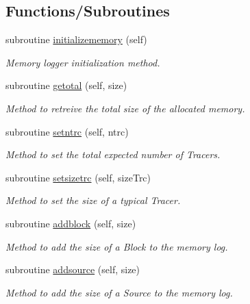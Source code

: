 \subsection*{Functions/\+Subroutines}
\begin{DoxyCompactItemize}
\item 
subroutine \mbox{\hyperlink{namespacesimulationmemory__mod_afaf06c4001ebc289c12a9358a99d224d}{initializememory}} (self)
\begin{DoxyCompactList}\small\item\em Memory logger initialization method. \end{DoxyCompactList}\item 
subroutine \mbox{\hyperlink{namespacesimulationmemory__mod_a3eb0ad61a559664ed4227ca4ad1746af}{getotal}} (self, size)
\begin{DoxyCompactList}\small\item\em Method to retreive the total size of the allocated memory. \end{DoxyCompactList}\item 
subroutine \mbox{\hyperlink{namespacesimulationmemory__mod_a936043befeeb2a3a79b31b519295b842}{setntrc}} (self, ntrc)
\begin{DoxyCompactList}\small\item\em Method to set the total expected number of Tracers. \end{DoxyCompactList}\item 
subroutine \mbox{\hyperlink{namespacesimulationmemory__mod_a48844ee646c6d29108f5bb1bdb9fd1bf}{setsizetrc}} (self, size\+Trc)
\begin{DoxyCompactList}\small\item\em Method to set the size of a typical Tracer. \end{DoxyCompactList}\item 
subroutine \mbox{\hyperlink{namespacesimulationmemory__mod_a2ade4b86d68e8daa4f22e1cdf7473e2c}{addblock}} (self, size)
\begin{DoxyCompactList}\small\item\em Method to add the size of a Block to the memory log. \end{DoxyCompactList}\item 
subroutine \mbox{\hyperlink{namespacesimulationmemory__mod_ae5682757ed7e3e005a1b54e5b44ed8a1}{addsource}} (self, size)
\begin{DoxyCompactList}\small\item\em Method to add the size of a Source to the memory log. \end{DoxyCompactList}\item 

\end{DoxyCompactItemize}
